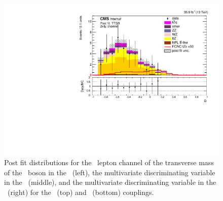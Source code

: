 \begin{figure}[htbp]
	\includegraphics[width=0.49\linewidth]{6_Search/Figures/ZctFit/shapes_fit_s_LepChan_2e1mu_TTSR_error_trial.pdf}
	\caption{Post fit distributions for the \eemu\ lepton channel of the transverse mass of the \PW\ boson in the \WZCR\ (left), the multivariate discriminating variable in the \STSR\ (middle), and the multivariate discriminating variable in the \TTSR\ (right) for the \Zut\ (top) and \Zct\ (bottom) couplings. }
	\label{fig:shapesfit2e1mu}
\end{figure}

